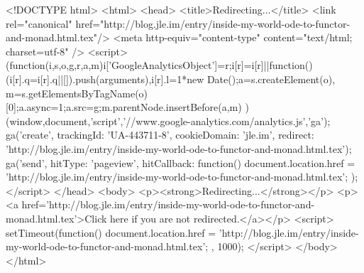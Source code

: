 <!DOCTYPE html>
<html>
<head>
<title>Redirecting...</title>
<link rel="canonical" href="http://blog.jle.im/entry/inside-my-world-ode-to-functor-and-monad.html.tex"/>
<meta http-equiv="content-type" content="text/html; charset=utf-8" />
<script>
(function(i,s,o,g,r,a,m){i['GoogleAnalyticsObject']=r;i[r]=i[r]||function(){
(i[r].q=i[r].q||[]).push(arguments)},i[r].l=1*new Date();a=s.createElement(o),
m=s.getElementsByTagName(o)[0];a.async=1;a.src=g;m.parentNode.insertBefore(a,m)
})(window,document,'script','//www.google-analytics.com/analytics.js','ga');
ga('create', { trackingId: 'UA-443711-8', cookieDomain: 'jle.im', redirect: 'http://blog.jle.im/entry/inside-my-world-ode-to-functor-and-monad.html.tex'});
ga('send', { hitType: 'pageview', hitCallback: function() { document.location.href = 'http://blog.jle.im/entry/inside-my-world-ode-to-functor-and-monad.html.tex'; } });
</script>
</head>
<body>
  <p><strong>Redirecting...</strong></p>
  <p><a href='http://blog.jle.im/entry/inside-my-world-ode-to-functor-and-monad.html.tex'>Click here if you are not redirected.</a></p>
  <script>
    setTimeout(function() { document.location.href = 'http://blog.jle.im/entry/inside-my-world-ode-to-functor-and-monad.html.tex'; }, 1000);
  </script>
</body>
</html>
